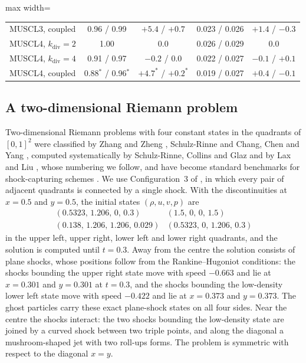\documentclass[smallextended]{svjour3}
\numberwithin{equation}{section}
\begin{document}
\begin{table}[!htbp]
\begin{adjustbox}{max width=\textwidth}
\begin{tabular}{@{}lcccc@{}}
MUSCL3, coupled & 0.96 / 0.99 & $+5.4$ / $+0.7$ & 0.023 / 0.026 & $+1.4$ / $-0.3$\\
MUSCL4, $k_{\mathrm{div}}=2$ & 1.00 & $0.0$ & 0.026 / 0.029 & $0.0$\\
MUSCL4, $k_{\mathrm{div}}=4$ & 0.91 / 0.97 & $-0.2$ / $0.0$ & 0.022 / 0.027 & $-0.1$ / $+0.1$\\
MUSCL4, coupled & 0.88$^*$ / 0.96$^*$ & $+4.7^*$ / $+0.2^*$ & 0.019 / 0.027 & $+0.4$ / $-0.1$\\
\bottomrule
\end{tabular}
\end{adjustbox}
\end{table}

\subsection{A two-dimensional Riemann problem}\label{sec:riemann}

Two-dimensional Riemann problems with four constant states in the quadrants of $[0,1]^2$ were classified by Zhang and Zheng \cite{ZhangZheng1990}, Schulz-Rinne \cite{SchulzRinne1993class} and Chang, Chen and Yang \cite{ChangChenYang1995,ChangChenYang2000}, computed systematically by Schulz-Rinne, Collins and Glaz \cite{SchulzRinne1993} and by Lax and Liu \cite{LaxLiu1998}, whose numbering we follow, and have become standard benchmarks for shock-capturing schemes \cite{KurganovTadmor2002}. We use Configuration~3 of \cite{LaxLiu1998,KurganovTadmor2002}, in which every pair of adjacent quadrants is connected by a single shock. With the discontinuities at $x=0.5$ and $y=0.5$, the initial states $(\rho,u,v,p)$ are
\[
\begin{array}{ll}
(0.5323,\,1.206,\,0,\,0.3) & (1.5,\,0,\,0,\,1.5)\\
(0.138,\,1.206,\,1.206,\,0.029) & (0.5323,\,0,\,1.206,\,0.3)
\end{array}
\]
in the upper left, upper right, lower left and lower right quadrants, and the solution is computed until $t=0.3$. Away from the centre the solution consists of plane shocks, whose positions follow from the Rankine--Hugoniot conditions: the shocks bounding the upper right state move with speed $-0.663$ and lie at $x=0.301$ and $y=0.301$ at $t=0.3$, and the shocks bounding the low-density lower left state move with speed $-0.422$ and lie at $x=0.373$ and $y=0.373$. The ghost particles carry these exact plane-shock states on all four sides. Near the centre the shocks interact: the two shocks bounding the low-density state are joined by a curved shock between two triple points, and along the diagonal a mushroom-shaped jet with two roll-ups forms. The problem is symmetric with respect to the diagonal $x=y$.
\end{document}
